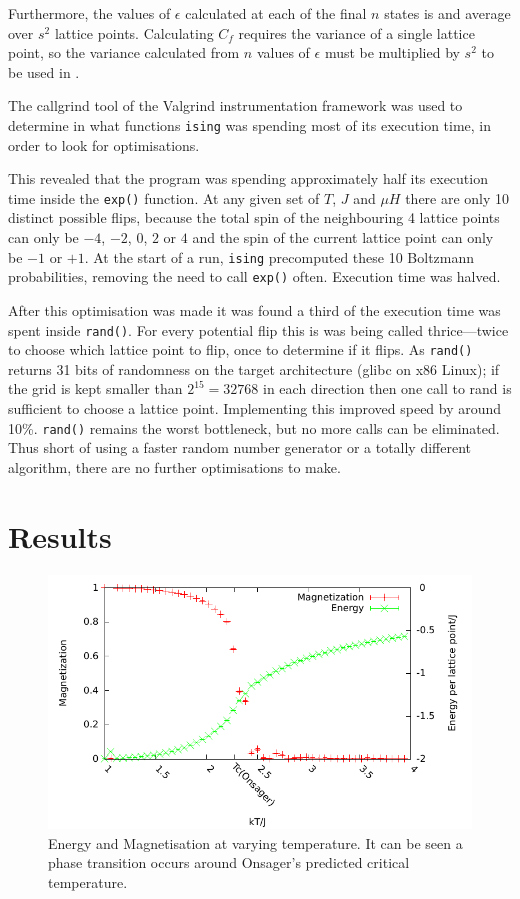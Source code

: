 \documentclass[12pt,a4paper,english]{article}
\begin{document}
Furthermore, the values of $\epsilon$ calculated at each of the final $n$ states is and average over $s^2$ lattice points.  Calculating $C_f$ requires the variance of a single lattice point, so the variance calculated from $n$ values of $\epsilon$ must be multiplied by $s^2$ to be used in .

\medskip

The callgrind tool of the Valgrind instrumentation framework \cite{valgrind} was used to determine in what functions \texttt{ising} was spending most of its execution time, in order to look for optimisations.

This revealed that the program was spending approximately half its execution time inside the \texttt{exp()} function. At any given set of $T$, $J$ and $\mu H$ there are only 10 distinct possible flips, because the total spin of the neighbouring 4 lattice points can only be $-4$, $-2$, $0$, $2$ or $4$ and the spin of the current lattice point can only be $-1$ or $+1$.  At the start of a run, \texttt{ising} precomputed these 10 Boltzmann probabilities, removing the need to call \texttt{exp()} often.  Execution time was halved.

After this optimisation was made it was found a third of the execution time was spent inside \texttt{rand()}. For every potential flip this is was being called thrice---twice to choose which lattice point to flip, once to determine if it flips.  As \texttt{rand()} returns 31 bits of randomness on the target architecture (glibc on x86 Linux); if the grid is kept smaller than $2^{15}=32768$ in each direction then one call to rand is sufficient to choose a lattice point.  Implementing this improved speed by around 10\%. \texttt{rand()} remains the worst bottleneck, but no more calls can be eliminated.  Thus short of using a faster random number generator or a totally different algorithm, there are no further optimisations to make.

\section{Results}
\label{sec:results}

\begin{figure}
\center
\includegraphics[width=\textwidth]{Optimized/tests/ising.pdf}
\caption{Energy and Magnetisation at varying temperature. It can be seen a phase transition occurs around Onsager's predicted critical temperature.}\label{fig:ising}
\end{figure}
\end{document}
